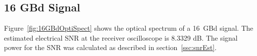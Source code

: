 \begin{refsection}
\subsection{16 GBd Signal}


%
%

%
Figure~\ref{fig:16GBdOptiSpect} shows the optical spectrum of a 16~GBd signal. The estimated electrical SNR at the receiver oscilloscope is 8.3329 dB. The signal power for the SNR was calculated as described in section~\ref{ssc:snrEst}.


\end{refsection}
